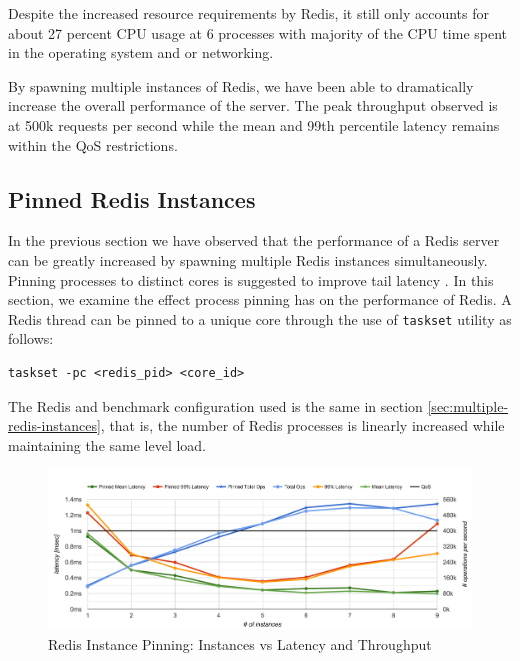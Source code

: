 Despite the increased resource requirements by Redis, it still only accounts for about 27 percent CPU usage at 6 processes with majority of the CPU time spent in the operating system and or networking.


By spawning multiple instances of Redis, we have been able to dramatically increase the overall performance of the server. The peak throughput observed is at 500k requests per second while the mean and 99th percentile latency remains within the QoS restrictions.


\subsection{Pinned Redis Instances}

In the previous section we have observed that the performance of a Redis server can be greatly increased by spawning multiple Redis instances simultaneously. Pinning processes to distinct cores is suggested to improve tail latency \cite{leverich2014reconciling}. In this section, we examine the effect process pinning has on the performance of Redis. A Redis thread can be pinned to a unique core through the use of \texttt{taskset} utility as follows:

\begin{lstlisting}
taskset -pc <redis_pid> <core_id>
\end{lstlisting}

The Redis and benchmark configuration used is the same in section \ref{sec:multiple-redis-instances}, that is, the number of Redis processes is linearly increased while maintaining the same level load.

\begin{figure}[h]
    \includegraphics[width=\textwidth]{./res/6_pinned.png}
    \caption{Redis Instance Pinning: Instances vs Latency and Throughput}
    \label{fig:6_pinned.png}
\end{figure}